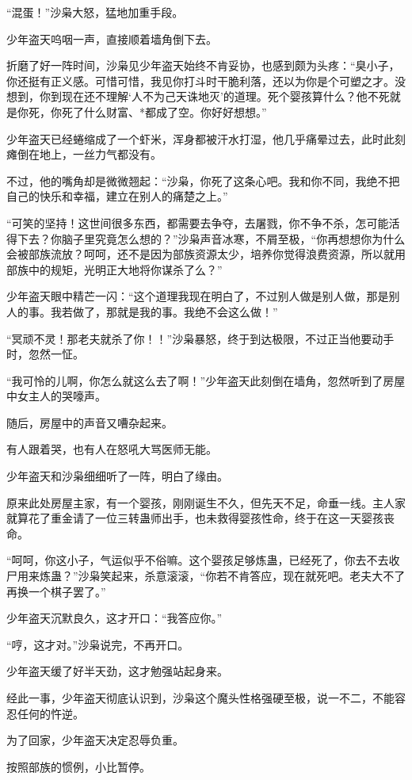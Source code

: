\begin{this_body}
“混蛋！”沙枭大怒，猛地加重手段。

少年盗天呜咽一声，直接顺着墙角倒下去。

折磨了好一阵时间，沙枭见少年盗天始终不肯妥协，也感到颇为头疼：“臭小子，你还挺有正义感。可惜可惜，我见你打斗时干脆利落，还以为你是个可塑之才。没想到，你到现在还不理解‘人不为己天诛地灭’的道理。死个婴孩算什么？他不死就是你死，你死了什么财富、*都成了空。你好好想想。”

少年盗天已经蜷缩成了一个虾米，浑身都被汗水打湿，他几乎痛晕过去，此时此刻瘫倒在地上，一丝力气都没有。

不过，他的嘴角却是微微翘起：“沙枭，你死了这条心吧。我和你不同，我绝不把自己的快乐和幸福，建立在别人的痛楚之上。”

“可笑的坚持！这世间很多东西，都需要去争夺，去屠戮，你不争不杀，怎可能活得下去？你脑子里究竟怎么想的？”沙枭声音冰寒，不屑至极，“你再想想你为什么会被部族流放？呵呵，还不是因为部族资源太少，培养你觉得浪费资源，所以就用部族中的规矩，光明正大地将你谋杀了么？”

少年盗天眼中精芒一闪：“这个道理我现在明白了，不过别人做是别人做，那是别人的事。我若做了，那就是我的事。我绝不会这么做！”

“冥顽不灵！那老夫就杀了你！！”沙枭暴怒，终于到达极限，不过正当他要动手时，忽然一怔。

“我可怜的儿啊，你怎么就这么去了啊！”少年盗天此刻倒在墙角，忽然听到了房屋中女主人的哭嚎声。

随后，房屋中的声音又嘈杂起来。

有人跟着哭，也有人在怒吼大骂医师无能。

少年盗天和沙枭细细听了一阵，明白了缘由。

原来此处房屋主家，有一个婴孩，刚刚诞生不久，但先天不足，命垂一线。主人家就算花了重金请了一位三转蛊师出手，也未救得婴孩性命，终于在这一天婴孩丧命。

“呵呵，你这小子，气运似乎不俗嘛。这个婴孩足够炼蛊，已经死了，你去不去收尸用来炼蛊？”沙枭笑起来，杀意滚滚，“你若不肯答应，现在就死吧。老夫大不了再换一个棋子罢了。”

少年盗天沉默良久，这才开口：“我答应你。”

“哼，这才对。”沙枭说完，不再开口。

少年盗天缓了好半天劲，这才勉强站起身来。

经此一事，少年盗天彻底认识到，沙枭这个魔头性格强硬至极，说一不二，不能容忍任何的忤逆。

为了回家，少年盗天决定忍辱负重。

按照部族的惯例，小比暂停。


\end{this_body}
